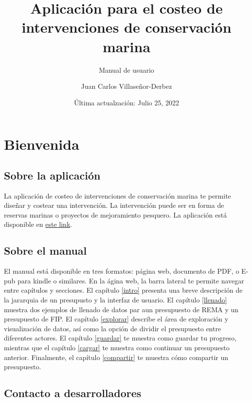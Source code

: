 \documentclass[
]{book}
\title{Aplicación para el costeo de intervenciones de conservación marina}
\subtitle{Manual de usuario}
\author{Juan Carlos Villaseñor-Derbez}
\date{Última actualzación: Julio 25, 2022}
\begin{document}
\maketitle

{
\setcounter{tocdepth}{1}
\tableofcontents
}
\hypertarget{bienvenida}{%
\chapter{Bienvenida}\label{bienvenida}}

\hypertarget{sobre-la-aplicaciuxf3n}{%
\section{Sobre la aplicación}\label{sobre-la-aplicaciuxf3n}}

La aplicación de costeo de intervenciones de conservación marina te permite diseñar y costear una intervención. La intervención puede ser en forma de reservas marinas o proyectos de mejoramiento pesquero. La aplicación está disponible en \href{https://innovacionazul.shinyapps.io/AppCosteo/}{este link}.

\hypertarget{sobre-el-manual}{%
\section{Sobre el manual}\label{sobre-el-manual}}

El manual está disponible en tres formatos: página web, documento de PDF, o E-pub para kindle o similares. En la ágina web, la barra lateral te permite navegar entre capítulos y secciones. El capítulo \ref{intro} presenta una breve descripción de la jararquia de un presupusto y la interfaz de usuario. El capítulo \ref{llenado} muestra dos ejemplos de llenado de datos par aun presupuesto de REMA y un presupuesto de FIP. El capítulo \ref{explorar} describe el área de exploración y visualización de datos, así como la opción de dividir el presupuesto entre diferentes actores. El capítulo \ref{guardar} te muestra como guardar tu progreso, mientras que el capítulo \ref{cargar} te muestra como continuar un presupuesto anterior. Finalmente, el capítulo \ref{compartir} te muestra cómo compartir un presupuesto.

\hypertarget{contacto-a-desarrolladores}{%
\section{Contacto a desarrolladores}\label{contacto-a-desarrolladores}}
\end{document}

